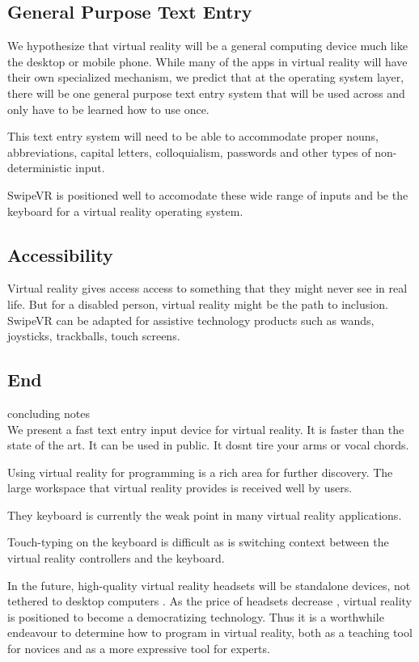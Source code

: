 \documentclass{sigchi}
\begin{document}
\subsection{General Purpose Text Entry}
We hypothesize that virtual reality will be a general computing device much like the desktop or mobile phone.
While many of the apps in virtual reality will have their own specialized mechanism, we predict that at the operating system layer, there will be one general purpose text entry system that will be used across and only have to be learned how to use once.

This text entry system will need to be able to accommodate proper nouns, abbreviations, capital letters, colloquialism, passwords and other types of non-deterministic input.

SwipeVR is positioned well to accomodate these wide range of inputs and be the keyboard for a virtual reality operating system.

\subsection{Accessibility}
Virtual reality gives access access to something that they might never see in real life.
But for a disabled person, virtual reality might be the path to inclusion.
SwipeVR can be adapted for assistive technology products such as wands, joysticks, trackballs, touch screens.


\subsection{End}

concluding notes
\\
We present a fast text entry input device for virtual reality.
It is faster than the state of the art.
It can be used in public.
It dosnt tire your arms or vocal chords.

Using virtual reality for programming is a rich area for further discovery.
The large workspace that virtual reality provides is received well by users.

They keyboard is currently the weak point in many virtual reality applications.

Touch-typing on the keyboard is difficult as is switching context between the virtual reality controllers and the keyboard.

In the future, high-quality virtual reality headsets will be standalone devices, not tethered to desktop computers \cite{schaller1997moore}.
As the price of headsets decrease \cite{brown2016virtual}, virtual reality is positioned to become a democratizing technology.
Thus it is a worthwhile endeavour to determine how to program in virtual reality, both as a teaching tool for novices and as a more expressive tool for experts.
\end{document}
